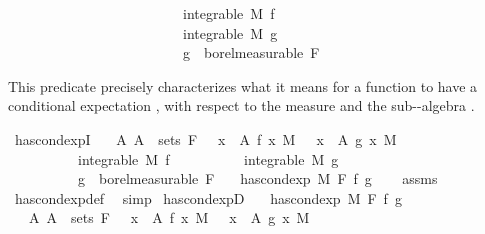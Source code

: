 \begin{isabellebody}
\ \ \ \ \ \ \ \ \ \ \ \ \ \ \ \ \ \ \ \ \ \ \ \ {\isasymand}\ integrable\ M\ f\ \isanewline
\ \ \ \ \ \ \ \ \ \ \ \ \ \ \ \ \ \ \ \ \ \ \ \ {\isasymand}\ integrable\ M\ g\ \isanewline
\ \ \ \ \ \ \ \ \ \ \ \ \ \ \ \ \ \ \ \ \ \ \ \ {\isasymand}\ g\ {\isasymin}\ borel{\isacharunderscore}{\kern0pt}measurable\ F{\isacharparenright}{\kern0pt}{\isachardoublequoteclose}%
\begin{isamarkuptext}%
This predicate precisely characterizes what it means for a function  to have a conditional expectation ,
      with respect to the measure  and the sub-\isa{{\isasymsigma}}-algebra .%
\end{isamarkuptext}\isamarkuptrue%
\isamarkupfalse%
\ has{\isacharunderscore}{\kern0pt}cond{\isacharunderscore}{\kern0pt}expI{\isacharprime}{\kern0pt}{\isacharcolon}{\kern0pt}\isanewline
\ \ \ {\isachardoublequoteopen}{\isasymAnd}A{\isachardot}{\kern0pt}\ A\ {\isasymin}\ sets\ F\ {\isasymLongrightarrow}\ {\isacharparenleft}{\kern0pt}{\isasymintegral}\ x\ {\isasymin}\ A{\isachardot}{\kern0pt}\ f\ x\ {\isasympartial}M{\isacharparenright}{\kern0pt}\ {\isacharequal}{\kern0pt}\ {\isacharparenleft}{\kern0pt}{\isasymintegral}\ x\ {\isasymin}\ A{\isachardot}{\kern0pt}\ g\ x\ {\isasympartial}M{\isacharparenright}{\kern0pt}{\isachardoublequoteclose}\isanewline
\ \ \ \ \ \ \ \ \ \ {\isachardoublequoteopen}integrable\ M\ f{\isachardoublequoteclose}\isanewline
\ \ \ \ \ \ \ \ \ \ {\isachardoublequoteopen}integrable\ M\ g{\isachardoublequoteclose}\isanewline
\ \ \ \ \ \ \ \ \ \ {\isachardoublequoteopen}g\ {\isasymin}\ borel{\isacharunderscore}{\kern0pt}measurable\ F{\isachardoublequoteclose}\isanewline
\ \ \ {\isachardoublequoteopen}has{\isacharunderscore}{\kern0pt}cond{\isacharunderscore}{\kern0pt}exp\ M\ F\ f\ g{\isachardoublequoteclose}\isanewline
%
\isadelimproof
\ \ %
\endisadelimproof
%
\isatagproof
{}\isamarkupfalse%
\ assms\ \isamarkupfalse%
\ has{\isacharunderscore}{\kern0pt}cond{\isacharunderscore}{\kern0pt}exp{\isacharunderscore}{\kern0pt}def\ \isamarkupfalse%
\ simp%
\endisatagproof
{\isafoldproof}%
%
\isadelimproof
\isanewline
%
\endisadelimproof
\isanewline
{}\isamarkupfalse%
\ has{\isacharunderscore}{\kern0pt}cond{\isacharunderscore}{\kern0pt}expD{\isacharcolon}{\kern0pt}\isanewline
\ \ \ {\isachardoublequoteopen}has{\isacharunderscore}{\kern0pt}cond{\isacharunderscore}{\kern0pt}exp\ M\ F\ f\ g{\isachardoublequoteclose}\isanewline
\ \ \ {\isachardoublequoteopen}{\isasymAnd}A{\isachardot}{\kern0pt}\ A\ {\isasymin}\ sets\ F\ {\isasymLongrightarrow}\ {\isacharparenleft}{\kern0pt}{\isasymintegral}\ x\ {\isasymin}\ A{\isachardot}{\kern0pt}\ f\ x\ {\isasympartial}M{\isacharparenright}{\kern0pt}\ {\isacharequal}{\kern0pt}\ {\isacharparenleft}{\kern0pt}{\isasymintegral}\ x\ {\isasymin}\ A{\isachardot}{\kern0pt}\ g\ x\ {\isasympartial}M{\isacharparenright}{\kern0pt}{\isachardoublequoteclose}\isanewline

\end{isabellebody}

